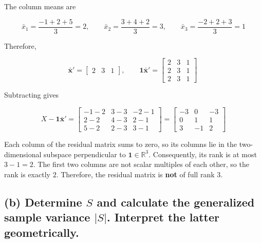 \documentclass[12pt]{article}
\begin{document}
The column means are

\vspace{0.2cm}

\[
\bar{x}_1=\frac{-1+2+5}{3}=2,\qquad
\bar{x}_2=\frac{3+4+2}{3}=3,\qquad
\bar{x}_3=\frac{-2+2+3}{3}=1
\]

\vspace{0.2cm}

Therefore,

\vspace{0.2cm}

\[
\bar{\boldsymbol{x}}'=\begin{bmatrix}2&3&1\end{bmatrix},
\qquad
\boldsymbol{1}\bar{\boldsymbol{x}}'
=\begin{bmatrix}
2&3&1\\
2&3&1\\
2&3&1
\end{bmatrix}\
\]

\vspace{0.2cm}

Subtracting gives

\vspace{0.2cm}

\[
X-\boldsymbol{1}\bar{\boldsymbol{x}}'
=\begin{bmatrix}
-1-2&3-3&-2-1\\
2-2&4-3&2-1\\
5-2&2-3&3-1
\end{bmatrix}
=\boxed{\begin{bmatrix}
-3&0&-3\\
0&1&1\\
3&-1&2
\end{bmatrix}}
\]

\vspace{0.2cm}

Each column of the residual matrix sums to zero, so its columns lie in the two-dimensional subspace perpendicular to $\boldsymbol{1}\in\mathbb{R}^3$. Consequently, its rank is at most $3-1=2$. The first two columns are not scalar multiples of each other, so the rank is exactly $2$. Therefore, the residual matrix is \textbf{not} of full rank $3$.

\vspace{0.2cm}

\subsection*{(b) Determine \(S\) and calculate the generalized sample variance \(|S|\). Interpret the latter geometrically.}
\end{document}
